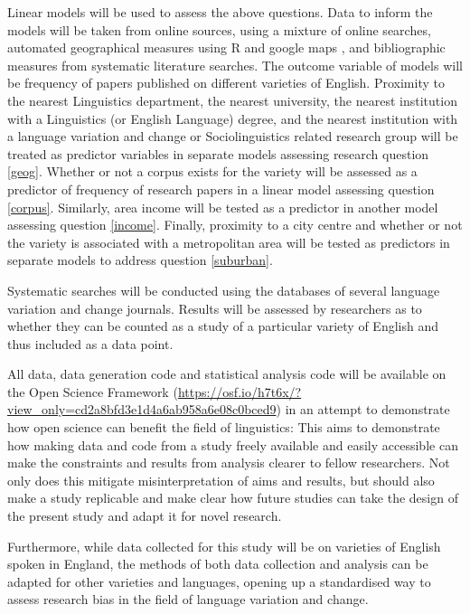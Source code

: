 \documentclass[12pt,a4paper]{article}
\begin{document}
	Linear models will be used to assess the above questions. Data to inform the models will be taken from online sources, using a mixture of online searches, automated geographical measures using R \citep{R2018} and google maps \citep{kahle2013ggmap}, and bibliographic measures from systematic literature searches. The outcome variable of models will be frequency of papers published on different varieties of English. Proximity to the nearest Linguistics department, the nearest university, the nearest institution with a Linguistics (or English Language) degree, and the nearest institution with a language variation and change or Sociolinguistics related research group will be treated as predictor variables in separate models assessing research question \ref{geog}. Whether or not a corpus exists for the variety will be assessed as a predictor of frequency of research papers in a linear model assessing question \ref{corpus}. Similarly, area income will be tested as a predictor in another model assessing question \ref{income}. Finally, proximity to a city centre and whether or not the variety is associated with a metropolitan area will be tested as predictors in separate models to address question \ref{suburban}.


	Systematic searches will be conducted using the databases of several language variation and change journals. Results will be assessed by researchers as to whether they can be counted as a study of a particular variety of English and thus included as a data point.


	All data, data generation code and statistical analysis code will be available on the Open Science Framework (\url{https://osf.io/h7t6x/?view_only=cd2a8bfd3e1d4a6ab958a6e08c0bced9}) in an attempt to demonstrate how open science can benefit the field of linguistics: This aims to demonstrate how making data and code from a study freely available and easily accessible can make the constraints and results from analysis clearer to fellow researchers. Not only does this mitigate misinterpretation of aims and results, but should also make a study replicable and make clear how future studies can take the design of the present study and adapt it for novel research.
	
	
	Furthermore, while data collected for this study will be on varieties of English spoken in England, the methods of both data collection and analysis can be adapted for other varieties and languages, opening up a standardised way to assess research bias in the field of language variation and change.
	
	
	
	\renewcommand\bibname{References} %
\end{document}
